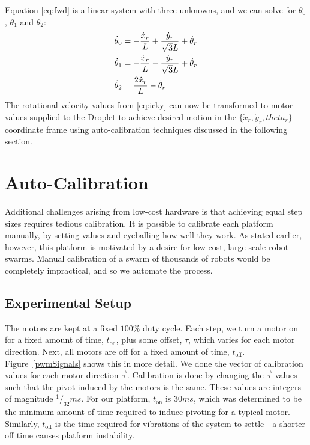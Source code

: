 \documentclass[letterpaper, 10pt, conference]{ieeeconf}
\begin{document}
Equation \ref{eq:fwd} is a linear system with three unknowns, and we can solve for $\dot{\theta}_0$, $\dot{\theta}_1$ and $\dot{\theta}_2$:
\begin{align}\label{eq:icky}
\dot{\theta}_0 & = -\frac{\dot{x}_r}{L} + \frac{\dot{y}_r}{\sqrt{3}L} + \dot{\theta}_r\notag\\
\dot{\theta}_1 & = -\frac{\dot{x}_r}{L} - \frac{\dot{y}_r}{\sqrt{3}L} + \dot{\theta}_r\notag\\
\dot{\theta}_2 & = \frac{2 \dot{x}_r}{L} - \dot{\theta}_r
\end{align}
The rotational velocity values from \eqref{eq:icky} can now be transformed to motor values supplied to the Droplet to achieve desired motion in the $\{\dot{x}_r, \dot{y}_r, \dot{theta}_r\}$ coordinate frame using auto-calibration techniques discussed in the following section.




\section{Auto-Calibration}
Additional challenges arising from low-cost hardware is that achieving equal step sizes requires tedious calibration.
It is possible to calibrate each platform manually, by setting values and eyeballing how well they work. As stated earlier, however, this platform is motivated by a desire for low-cost, large scale robot swarms.  Manual calibration of a swarm of thousands of robots would be completely impractical, and so we automate the process.

\subsection{Experimental Setup}
The motors are kept at a fixed $100\%$ duty cycle. Each step, we turn a motor on for a fixed amount of time, $t_{\text{on}}$, plus some offset, $\tau$,  which varies for each motor direction. Next, all motors are off for a fixed amount of time, $t_{\text{off}}$. Figure~\ref{pwmSignals} shows this in more detail. We done the vector of calibration values for each motor direction $\vec{\tau}$. Calibration is done by changing the $\vec{\tau}$ values such that the pivot induced by the motors is the same. These values are integers of magnitude $^1/_{32}$$ms$. For our platform, $t_{\text{on}}$ is $30ms$, which was determined to be the minimum amount of time required to induce pivoting for a typical motor. Similarly, $t_{\text{off}}$ is the time required for vibrations of the system to settle---a shorter off time causes platform instability.
\end{document}
